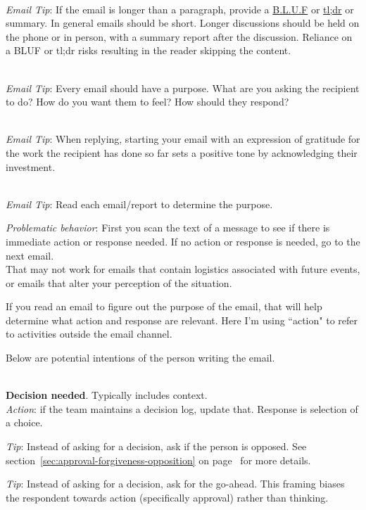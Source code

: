 \ \\
\textit{Email Tip}: If the email is longer than a paragraph, provide a \href{https://en.wikipedia.org/wiki/BLUF_(communication)}{B.L.U.F} or \href{https://en.wikipedia.org/wiki/Wikipedia:Too_long;_didn\%27t_read}{tl;dr} or summary. In general emails should be short. Longer discussions should be held on the phone or in person, with a summary report after the discussion. Reliance on a BLUF or tl;dr risks resulting in the reader skipping the content. 

\ \\
\textit{Email Tip}: Every email should have a purpose. What are you asking the recipient to do? How do you want them to feel? How should they respond?

\ \\
\textit{Email Tip}: When replying, starting your email with an expression of gratitude for the work the recipient has done so far sets a positive tone by acknowledging their investment.

\ \\
\textit{Email Tip}: Read each email/report to determine the purpose.

\textit{Problematic behavior}: First you scan the text of a message to see if there is immediate action or response needed. If no action or response is needed, go to the next email. \\
That may not work for emails that contain logistics associated with future events, or emails that alter your perception of the situation.


If you read an email to figure out the purpose of the email, that will help determine what action and response are relevant. Here I'm using ``action" to refer to activities outside the email channel. 


Below are potential intentions of the person writing the email. 

\ \\
\textbf{Decision needed}. Typically includes context. \\
\textit{Action}: if the team maintains a decision log, update that.
Response is selection of a choice.

\textit{Tip}: Instead of asking for a decision, ask if the person is opposed. See section~\ref{sec:approval-forgiveness-opposition} on page~\pageref{sec:approval-forgiveness-opposition} for more details.

\textit{Tip}: Instead of asking for a decision, ask for the go-ahead. This framing biases the respondent towards action (specifically approval) rather than thinking. 


